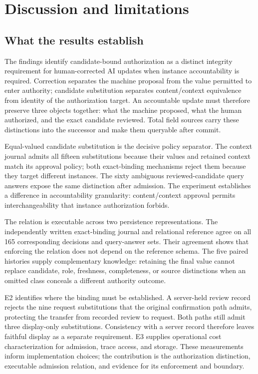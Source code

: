 \section{Discussion and limitations}
\label{sec:discussion}

\subsection{What the results establish}
The findings identify candidate-bound authorization as a distinct integrity requirement for human-corrected AI updates when instance accountability is required. Correction separates the machine proposal from the value permitted to enter authority; candidate substitution separates content/context equivalence from identity of the authorization target. An accountable update must therefore preserve three objects together: what the machine proposed, what the human authorized, and the exact candidate reviewed. Total field sources carry these distinctions into the successor and make them queryable after commit.

Equal-valued candidate substitution is the decisive policy separator. The context journal admits all fifteen substitutions because their values and retained context match its approval policy; both exact-binding mechanisms reject them because they target different instances. The sixty ambiguous reviewed-candidate query answers expose the same distinction after admission. The experiment establishes a difference in accountability granularity: content/context approval permits interchangeability that instance authorization forbids.

The relation is executable across two persistence representations. The independently written exact-binding journal and relational reference agree on all 165 corresponding decisions and query-answer sets. Their agreement shows that enforcing the relation does not depend on the reference schema. The five paired histories supply complementary knowledge: retaining the final value cannot replace candidate, role, freshness, completeness, or source distinctions when an omitted class conceals a different authority outcome.

E2 identifies where the binding must be established. A server-held review record rejects the nine request substitutions that the original confirmation path admits, protecting the transfer from recorded review to request. Both paths still admit three display-only substitutions. Consistency with a server record therefore leaves faithful display as a separate requirement. E3 supplies operational cost characterization for admission, trace access, and storage. These measurements inform implementation choices; the contribution is the authorization distinction, executable admission relation, and evidence for its enforcement and boundary.


